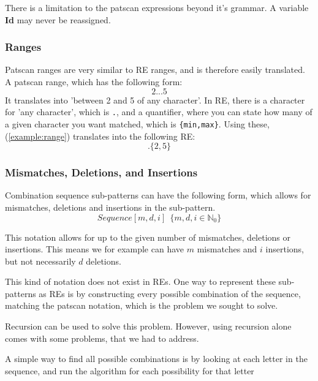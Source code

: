 \documentclass[12pt]{article}
\theoremstyle{definition}
\begin{document}
There is a limitation to the patscan expressions beyond it's grammar. A variable \textbf{Id} may never be reassigned.

\subsubsection{Ranges}

Patscan ranges are very similar to RE ranges, and is therefore easily translated. A patscan range, which has the following form:
\begin{equation}
\label{example:range}
	2...5
\end{equation}
It translates into 'between 2 and 5 of any character'. In RE, there is a character for 'any character', which is \texttt{.}, and a quantifier, where you can state how many of a given character you want matched, which is \texttt{\{min,max\}}. Using these, (\ref{example:range}) translates into the following RE:
\begin{equation}
.\{2,5\}
\end{equation}

\subsubsection{Mismatches, Deletions, and Insertions}

Combination sequence sub-patterns can have the following form, which allows for mismatches, deletions and insertions in the sub-pattern. 
\begin{equation}
	Sequence[m, d, i] \ \ \{m, d, i \in \mathbb{N}_0 \}
\end{equation} 

This notation allows for up to the given number of mismatches, deletions or insertions. This means we for example can have $m$ mismatches and $i$ insertions, but not necessarily $d$ deletions.

This kind of notation does not exist in REs. One way to represent these sub-patterns as REs is by constructing every possible combination of the sequence, matching the patscan notation, which is the problem we sought to solve.

Recursion can be used to solve this problem. However, using recursion alone comes with some problems, that we had to address. 

A simple way to find all possible combinations is by looking at each letter in the sequence, and run the algorithm for each possibility for that letter
\end{document}
